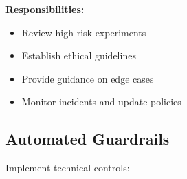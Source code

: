 \textbf{Responsibilities:}
\begin{itemize}
    \item Review high-risk experiments
    \item Establish ethical guidelines
    \item Provide guidance on edge cases
    \item Monitor incidents and update policies
\end{itemize}

\subsection{Automated Guardrails}

Implement technical controls:

\lstset{language=Python, caption=Automated Ethical Guardrails}
